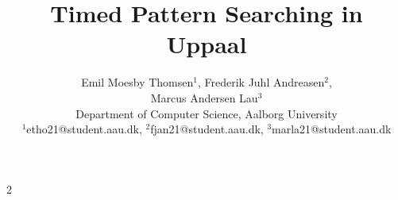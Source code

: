 \documentclass{article}
\begin{document}


\title{Timed Pattern Searching in Uppaal}


\author{Emil Moesby Thomsen$^1$, Frederik Juhl Andreasen$^2$, \\Marcus Andersen Lau$^3$\\
    \small{Department of Computer Science, Aalborg University}\\
    \small{$^1$etho21@student.aau.dk, $^2$fjan21@student.aau.dk, $^3$marla21@student.aau.dk}}
\maketitle

\begin{multicols}{2}
    
    
    
    
    
    
    
\end{multicols}{2}

\printbibliography
\end{document}
